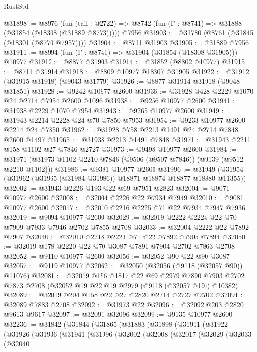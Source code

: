 \begin{lexlean}{RustStd}
\begin{coremodule}
@31898 := @8976
    (fun (tail : @2722) => @8742 (fun (Γ : @8741) => @31888 (@31854 (@18308 (@31889 @8773)))))
    @7956
@31903 := @31780 (@8761 (@31845 (@18301 (@8770 @7957))))
@31904 := @8711 @31903
@31905 := @31889 @7956
@31911 := @8994 (fun (Γ : @8741) => @31904 (@31854 (@18308 @31905))) @10977
@31912 := @8877 @31903
@31914 := @31852 (@8802 @10977)
@31915 := @8711 @31914
@31918 := @8809 @10977 @18307 @31905
@31922 := @31912 (@31915 @31918) (@9043 @31779)
@31926 := @8877 @31914 @31918 (@9048 @31851)
@31928 := @9242 @10977 @2600
@31936 := @31928 @428 @2229 @1070 @24 @2714 @7954 @2600 @1096
@31938 := @9256 @10977 @2600
@31941 := @31938 @2229 @1070 @7954
@31943 := @9265 @10977 @2600
@31949 := @31943 @2214 @2228 @24 @70 @7850 @7953
@31954 := @9233 @10977 @2600 @2214 @24 @7850
@31962 := @31928 @758 @2213 @1491 @24 @2714 @7848 @2600 @1497
@31965 := @31938 @2213 @1491 @7848
@31971 := @31943 @2211 @158 @1102 @27 @7846 @2727
@31973 := @9498 @10977 @2600
@31984 := @31971 (@31973 @1102 @2210 @7846 (@9506 (@9507 @7846)) (@9139 (@9512 @2210 @1102)))
@31986 := @9381 @10977 @2600
@31996 := @31949 (@31954 (@31962 (@31965 (@31984 @31986)) @18871 @18874 @18877 @18880 @11355))
@32002 := @31943 @2226 @193 @22 @69 @7951 @2823
@32004 := @9071 @10977 @2600
@32008 := @32004 @2226 @22 @7934 @7949
@32010 := @9081 @10977 @2600
@32017 := @32010 @2216 @2225 @71 @22 @7934 @7947 @7936
@32019 := @9094 @10977 @2600
@32029 := @32019 @2222 @2224 @22 @70 @7909 @7933 @7946 @2702 @7855 @2708
@32033 := @32004 @2222 @22 @7892 @7907
@32040 := @32010 @2218 @2221 @71 @22 @7892 @7905 @7894
@32050 := @32019 @178 @2220 @22 @70 @3087 @7891 @7904 @2702 @7863 @2708
@32052 := @9110 @10977 @2600
@32056 := @32052 @90 @22 @90 @3087
@32057 := @9119 @10977
@32062 := @32050 (@32056 (@9118 (@32057 @90)) @11076)
@32081 := @32019
    @156
    @1817
    @22
    @69
    @2979
    @7890
    @7903
    @2702
    @7873
    @2708
    (@32052 @19 @22 @19 @2979 (@9118 (@32057 @19)) @10382)
@32089 := @32019 @204 @158 @22 @27 @2820 @2714 @2727 @2702
@32091 := @32089 @7883 @2708
@32092 := @31973 @22
@32096 := @32092 @203 @2820 @9613 @9617
@32097 := @32091 @32096
@32099 := @9135 @10977 @2600
@32236 := @31842
    (@31844
      (@31865
        (@31883
          (@31898
            (@31911
              (@31922
                (@31926
                  (@31936
                    (@31941
                      (@31996
                        (@32002
                          (@32008
                            (@32017
                              (@32029
                                (@32033
                                  (@32040

\end{coremodule}
\end{lexlean}
